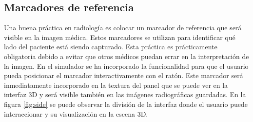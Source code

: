 \subsection{Marcadores de referencia}
\label{xray:sidemark}
Una buena práctica en radiología es colocar un marcador de referencia que será visible en la imagen médica. Estos marcadores se utilizan para identificar qué lado del paciente está siendo capturado. Esta práctica es prácticamente obligatoria debido a evitar que otros médicos puedan errar en la interpretación de la imagen. En el simulador se ha incorporado la funcionalidad para que el usuario pueda posicionar el marcador interactivamente con el ratón. Este marcador será inmediatamente incorporado en la textura del panel que se puede ver en la interfaz 3D y será visible también en las imágenes radiográficas guardadas. En la figura \ref{fig:side} se puede observar la división de la interfaz donde el usuario puede interaccionar y su visualización en la escena 3D. 

